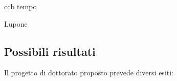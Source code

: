 \documentclass{gs-adonis}
\begin{document}
\begin{description}
  \item[ccb tempo]
\end{description}

\begin{description}
  \item[Lupone]
\end{description}










\subsection{Possibili risultati}%


Il progetto di dottorato proposto prevede diversi esiti:
\end{document}
